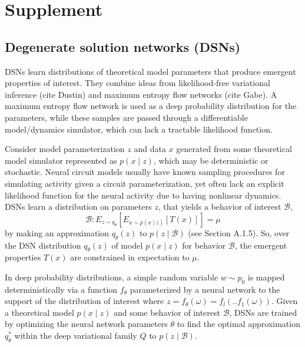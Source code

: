 \documentclass[11pt]{article}
\begin{document}



\appendix

\section{Supplement}

\subsection{Degenerate solution networks (DSNs)}
DSNs learn distributions of theoretical model parameters that produce emergent properties of interest.  They combine ideas from likelihood-free variational inference (cite Dustin) and maximum entropy flow networks (cite Gabe).  A maximum entropy flow network is used as a deep probability distribution for the parameters, while these samples are passed through a differentiable model/dynamics simulator, which can lack a tractable likelihood function.

Consider model parameterization $z$ and data $x$ generated from some theoretical model simulator represented as $p(x \mid z)$, which may be deterministic or stochastic.  Neural circuit models usually have known sampling procedures for simulating activity given a circuit parameterization, yet often lack an explicit likelihood function for the neural activity due to having nonlinear dynamics. DSNs learn a distribution on parameters $z$, that yields a behavior of interest $\mathcal{B}$,
\begin{equation}
\mathcal{B}: E_{z \sim q_\theta}\left[ E_{x\sim p(x \mid z)}\left[T(x)\right] \right] = \mu
\end{equation}
by making an approximation $q_\theta(z)$ to $p(z \mid \mathcal{B})$ (see Section A.1.5).  So, over the DSN distribution $q_\theta(z)$ of model $p(x \mid z)$ for behavior $\mathcal{B}$, the emergent properties $T(x)$ are constrained in expectation to $\mu$.

 In deep probability distributions, a simple random variable $w \sim p_0$ is mapped deterministically via a function $f_\theta$ parameterized by a neural network to the support of the distribution of interest where $z = f_{\theta}(\omega) = f_l(..f_1(\omega))$.  Given a theoretical model $p(x \mid z)$ and some behavior of interest $\mathcal{B}$, DSNs are trained by optimizing the neural network parameters $\theta$ to find the optimal approximation $q_{\theta}^*$ within the deep variational family $Q$ to $p(z \mid \mathcal{B})$.
\end{document}
